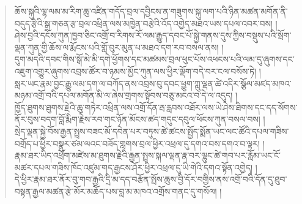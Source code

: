 \documentclass{article}
\begin{document}
\newlength{\saveleftmargini} %
\setlength{\saveleftmargini}{\leftmargini} %
\setlength{\leftmargini}{0em} %
\begin{verse}
    ཆོས་སྐུའི་ལྷ་ལམ་མ་རིག་ཆུ་འཛིན་གདོད་བྲལ་དབྱིངས་ན་གཟུགས་སྐུ་ལག་པའི་ཉིན་མཚན་མགོན་ནི་བདུད་རྩིའི་སྒྲ་གཅན་རྩ་བྲལ་འཕྲིན་ལས་མཁྱེན་བརྩེའི་འོད་འགྱེད་མཐའ་ཡས་དཔལ་འབར་བས། །\\
    ཤེས་བྱའི་དངོས་ཀུན་ཁྱབ་ཅིང་འགྲོ་བ་རིགས་རོ་ལམ་རྒྱུད་དབང་པོ་སྐྱེ་གནས་དུས་ཀྱིས་བསྡུས་པའི་སྲོག་ལྡན་ཀུན་གྱི་ཆོས་ལ་རྨོངས་པའི་གློ་བུར་མུན་པ་མཐའ་དག་རབ་བསལ་ནས། །\\
    དུག་མདའི་དབང་གིས་སྒོ་མེ་མི་དགེ་ཕྱོགས་དང་མཚམས་བྲལ་ཕུང་པོས་འཕངས་པའི་ལམ་དུ་ཞུགས་དང་འཇུག་འགྱུར་ཞུགས་འབྲས་ཚོར་བ་ཉམས་མྱོང་ཀུན་ལས་ཕྱིར་ལྡོག་བདེ་བར་ངལ་བསོས་ཏེ། །\\
    སླར་ཡང་རྣམ་བྱང་རྒྱུ་ལམ་དག་ལ་བཀོད་ནས་འབྲས་བུ་དབང་ཕྱུག་ཀླུ་ལྡན་ཚེ་འདིར་སྩོལ་མཛད་མཁའ་མཉམ་འགྲོ་བའི་དཔལ་མགོན་མི་ལ་ཞེས་གྲགས་སྟོབས་བཅུ་མངའ་བ་དེ་ལ་འདུད། །\\

    ཁྱོད་ཐུགས་ཐུགས་རྗེའི་ཆུ་གཏེར་འཕྲིན་ལས་འགྲོ་དོན་རྦ་རླབས་འཐོར་ལས་ཡེ་ཤེས་ཐིགས་དང་དད་སོགས་ནོར་བུས་བདག་བློ་རྨིག་རྗེས་རབ་གང་ཉོན་མོངས་ཚད་གདུང་དབུལ་ཕོངས་ཀུན་བསལ་བས། །\\
    སྲེད་ལྡན་སྐྱེ་བོས་རྒྱན་སྤྲས་བཟང་མོ་དབེན་པར་བཏུས་ཚེ་ཚངས་སྤྱོད་སྨོན་ཡང་ལང་ཚོའི་དཔལ་གཟིས་བགྲོད་པ་ཕྱིར་བསྣུར་ཙམ་ལའང་བཟོད་གླགས་བྲལ་ཕྱིར་འཕྲལ་དུ་དགའ་བས་དགའ་བ་ལྟར། །\\
    རྣམ་ཐར་ཡིད་འཕྲོག་མཛེས་མ་ཐུགས་རྗེའི་རྒྱན་སྤྲས་སྐལ་ལྡན་རྣ་བར་ལྷུང་ཚེ་གབ་པར་རློམ་ཡང་ངོ་མཚར་དཔལ་གཟིས་ཁོང་འཛུམ་གད་རྒྱངས་ཤོར་ཕྱིར་འཕྲལ་དུ་ཡི་གེའི་དགའ་སྟོན་འགྱེད། །\\
    དེ་ཕྱིར་རྣམ་ཐར་ནོར་བུ་གབ་རྒྱའི་དྲི་མ་དད་བརྩོན་སྤོས་ཆུས་བྱི་དོར་བགྱིས་ནས་འགྲོ་བའི་དོན་དུ་ཐུབ་བསྟན་རྒྱལ་མཚན་རྩེ་མོར་མཆོད་པས་བླ་མ་མཁའ་འགྲོས་གནང་དུ་གསོལ། །\\
\end{verse}
\setlength{\leftmargini}{\saveleftmargini}%
\end{document}
